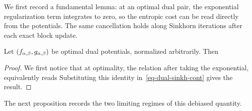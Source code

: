 We first record a fundamental lemma: at an optimal dual pair, the exponential regularization term integrates to zero, so the entropic cost can be read directly from the potentials. The same cancellation holds along Sinkhorn iterations after each exact block update.

\begin{lem}
	Let $(f_{\alpha,\beta},g_{\alpha,\beta})$ be optimal dual potentials, normalized arbitrarily. Then
\end{lem}
\begin{proof}
	We first notice that at optimality, the relation
	after taking the exponential, equivalently reads
	Substituting this identity in~\eqref{eq-dual-sinkh-cont} gives the result.
\end{proof}

The next proposition records the two limiting regimes of this debiased quantity.

